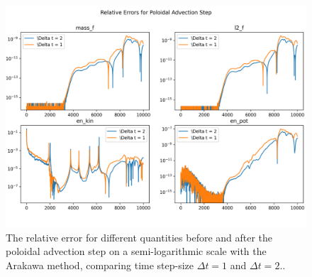 \begin{figure}
	\centering
	\includegraphics[width=0.9\linewidth]{rel_err_log akw}
	\caption{The relative error for different quantities before and after the poloidal advection step on a semi-logarithmic scale with the Arakawa method, comparing time step-size $\Delta t = 1$ and $\Delta t = 2$..}
	\label{fig:relerrlog_akw}
\end{figure}



